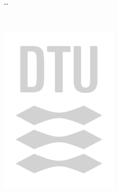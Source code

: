 \begin{titlepage}
    \begin{adjustwidth*}{}{-\marginparwidth-\marginparsep}
    \begin{center}
        \large

        \hfill

        \vfill

        \begingroup
            \color{CTtitle}\spacedallcaps{\myTitle} \\ \bigskip
        \endgroup

        \spacedlowsmallcaps{\myName}

        \vfill

        \includegraphics[width=6cm]{figures/Grey_CMYK.pdf} \\ \medskip

        \mySubtitle \\ \medskip
        \myDegree \\
        \myDepartment \\
        \myFaculty \\
        \myUni \\ \bigskip

        \myTime

        \vfill

    \end{center}
  \end{adjustwidth*}
\end{titlepage}
